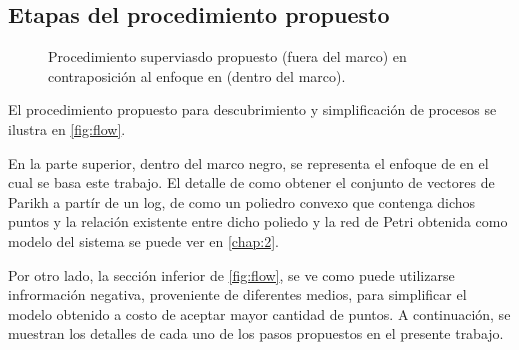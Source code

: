 \subsection{Etapas del procedimiento propuesto}
\label{sec:3.algodisco stages}

\begin{figure}[t]
    \begin{center}
    \caption{Procedimiento superviasdo propuesto (fuera del marco) en contraposición al enfoque
        en \cite{CarmonaC14} (dentro del marco).}
    \label{fig:flow}
    \end{center}
\end{figure}

El procedimiento propuesto para descubrimiento y simplificación de procesos se ilustra en \autoref{fig:flow}.

En la parte superior, dentro del marco negro, se representa el enfoque de \cite{CarmonaC14} en el cual se 
basa este trabajo. El detalle de como obtener el conjunto de vectores de Parikh a partír de un log,
de como un poliedro convexo que contenga dichos puntos y la relación existente entre dicho poliedo
y la red de Petri obtenida como modelo del sistema se puede ver en \autoref{chap:2}.

Por otro lado, la sección inferior de \autoref{fig:flow}, se ve como puede utilizarse infrormación negativa,
proveniente de diferentes medios, para simplificar el modelo obtenido a costo de aceptar mayor cantidad
de puntos. A continuación, se muestran los detalles de cada uno de los pasos propuestos en el presente trabajo.


